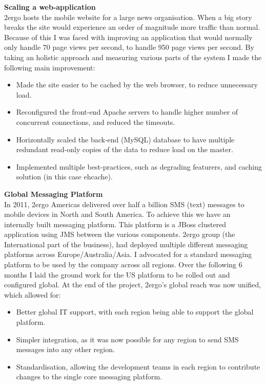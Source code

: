 \documentclass[letterpaper,10pt]{article}
\begin{document}
\textbf{Scaling a web-application}\\
2ergo hosts the mobile website for a large news organisation. When a big story breaks the site would experience an order of magnitude more traffic than normal.
Because of this I was faced with improving an application that would normally only handle 70 page views per second, to handle 950 page views per second.
By taking an holistic approach and measuring various parts of the system I made the following main improvement:

 \begin{itemize}
  \item Made the site easier to be cached by the web browser, to reduce unnecessary load.
  \item Reconfigured the front-end Apache servers to handle higher number of concurrent connections, and reduced the timeouts. 
  \item Horizontally scaled the back-end (MySQL) database to have multiple redundant read-only copies of the data to reduce load on the master.
  \item Implemented multiple best-practices, such as degrading featurers, and caching solution (in this case ehcache).

 \end{itemize}
\vspace{1em}


\textbf{Global Messaging Platform}\\
In 2011, 2ergo Americas delivered over half a billion SMS (text) messages to mobile devices in North and South America. To achieve this we have an internally
built messaging platform. This platform is a JBoss clustered application using JMS between the various components. 2ergo group (the International part
of the business), had deployed multiple different messaging platforms across Europe/Australia/Asia. I advocated for a standard messaging platform to
be used by the company across all regions. Over the following 6 months I laid the ground work for the US platform to be rolled out and configured global. 
At the end of the project, 2ergo's global reach was now unified, which allowed for:
 \begin{itemize}
  \item Better global IT support, with each region being able to support the global platform.
  \item Simpler integration, as it was now possible for any region to send SMS messages into any other region.
  \item Standardisation, allowing the development teams in each region to contribute changes to the single core messaging platform.
 \end{itemize}
\vspace{1em}
\end{document}
